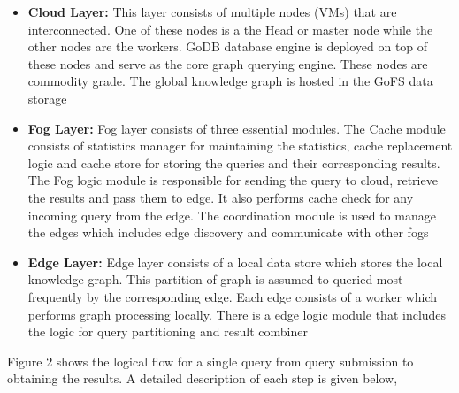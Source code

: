 \documentclass[conference]{IEEEtran}
\begin{document}
\begin{itemize}%
	\item \textbf{Cloud Layer:} This layer consists of multiple nodes (VMs) that are interconnected. One of these nodes is a the Head or master node while the other nodes are the workers. GoDB database engine is deployed on top of these nodes and serve as the core graph querying engine. These nodes are commodity grade. The global knowledge graph is hosted in the GoFS data storage
	\item \textbf{Fog Layer: } Fog layer consists of three essential modules. The Cache module consists of statistics manager for maintaining the statistics, cache replacement logic and cache store for storing the queries and their corresponding results. The Fog logic module is responsible for sending the query to cloud, retrieve the results and pass them to edge. It also performs cache check for any incoming query from the edge. The coordination module is used to manage the edges which includes edge discovery and communicate with other fogs
	\item \textbf{Edge Layer: }	Edge layer consists of a local data store which stores the local knowledge graph. This partition of graph is assumed to queried most frequently by the corresponding edge. Each edge consists of a worker which performs graph processing locally. There is a edge logic module that includes the logic for query partitioning and result combiner 
\end{itemize}

Figure 2 shows the logical flow for a single query from query submission to obtaining the results. A detailed description of each step is given below,
\end{document}
